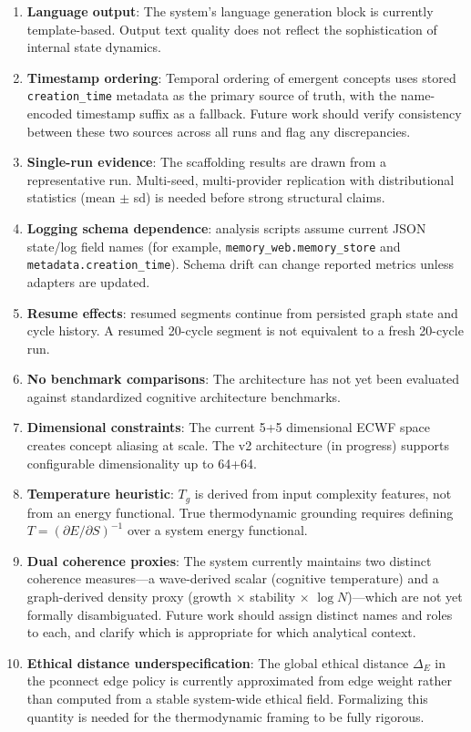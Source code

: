 \documentclass[11pt,a4paper]{article}
\begin{document}
\begin{enumerate}[nosep]
    \item \textbf{Language output}: The system's language generation block is 
          currently template-based. Output text quality does not reflect the 
          sophistication of internal state dynamics.
    \item \textbf{Timestamp ordering}: Temporal ordering of emergent concepts 
          uses stored \texttt{creation\_time} metadata as the primary source 
          of truth, with the name-encoded timestamp suffix as a fallback. 
          Future work should verify consistency between these two sources 
          across all runs and flag any discrepancies.
    \item \textbf{Single-run evidence}: The scaffolding results are drawn 
          from a representative run. Multi-seed, multi-provider replication 
          with distributional statistics (mean $\pm$ sd) is needed before 
          strong structural claims.
    \item \textbf{Logging schema dependence}: analysis scripts assume current JSON
          state/log field names (for example,
          \texttt{memory\_web.memory\_store} and
          \texttt{metadata.creation\_time}). Schema drift can change reported
          metrics unless adapters are updated.
    \item \textbf{Resume effects}: resumed segments continue from persisted graph
          state and cycle history. A resumed 20-cycle segment is not equivalent
          to a fresh 20-cycle run.
    \item \textbf{No benchmark comparisons}: The architecture has not yet been 
          evaluated against standardized cognitive architecture benchmarks.
    \item \textbf{Dimensional constraints}: The current 5+5 dimensional ECWF 
          space creates concept aliasing at scale. The v2 architecture 
          (in progress) supports configurable dimensionality up to 64+64.
    \item \textbf{Temperature heuristic}: $T_g$ is derived from input 
          complexity features, not from an energy functional. True 
          thermodynamic grounding requires defining $T = (\partial E / 
          \partial S)^{-1}$ over a system energy functional.
    \item \textbf{Dual coherence proxies}: The system currently maintains 
          two distinct coherence measures---a wave-derived scalar 
          (cognitive temperature) and a graph-derived density proxy 
          (growth $\times$ stability $\times$ $\log N$)---which are not 
          yet formally disambiguated. Future work should assign distinct 
          names and roles to each, and clarify which is appropriate for 
          which analytical context.
    \item \textbf{Ethical distance underspecification}: The global ethical 
          distance $\Delta_E$ in the pconnect edge policy is currently 
          approximated from edge weight rather than computed from a 
          stable system-wide ethical field. Formalizing this quantity is 
          needed for the thermodynamic framing to be fully rigorous.
\end{enumerate}
\end{document}
